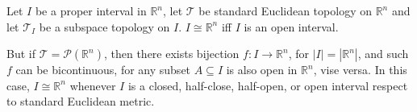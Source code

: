\begin{example}
	Let $I$ be a proper interval in $\mathbb R^n$, let $\mathcal T$ be standard Euclidean topology on $\mathbb R^n$ and let $\mathcal T_I$ be a subspace topology on $I$. $I \cong \mathbb R^n$ iff $I$ is an open interval.
	
	But if $\mathcal T = \mathcal P(\mathbb R^n)$, then there exists bijection $f: I \to \mathbb R^n$, for $|I| = |\mathbb R^n|$, and such $f$ can be bicontinuous, for any subset $A \subseteq I$ is also open in $\mathbb R^n$, vise versa. In this case, $I \cong \mathbb R^n$ whenever $I$ is a closed, half-close, half-open, or open interval respect to standard Euclidean metric.
\end{example}




































%